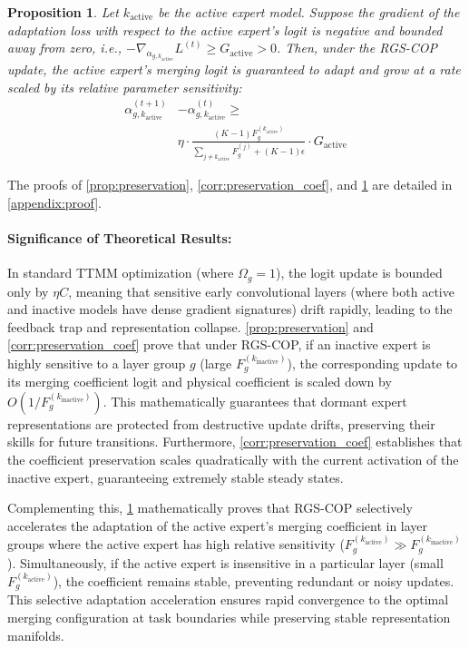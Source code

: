 \documentclass{article}
\theoremstyle{plain}
\newtheorem{proposition}[theorem]{Proposition}
\theoremstyle{definition}
\theoremstyle{remark}
\begin{document}
\begin{proposition}\label{prop:acceleration}
Let $k_{\text{active}}$ be the active expert model. Suppose the gradient of the adaptation loss with respect to the active expert's logit is negative and bounded away from zero, i.e., $-\nabla_{\alpha_{g, k_{\text{active}}}} L^{(t)} \geq G_{\text{active}} > 0$. Then, under the RGS-COP update, the active expert's merging logit is guaranteed to adapt and grow at a rate scaled by its relative parameter sensitivity:
\begin{equation}
\begin{aligned}
    \alpha^{(t+1)}_{g, k_{\text{active}}} &- \alpha^{(t)}_{g, k_{\text{active}}} \geq \\
    &\eta \cdot \frac{(K-1) F^{(k_{\text{active}})}_g}{\sum_{j \neq k_{\text{active}}} F^{(j)}_g + (K-1)\epsilon} \cdot G_{\text{active}}
\end{aligned}
\end{equation}
\end{proposition}

The proofs of \cref{prop:preservation}, \cref{corr:preservation_coef}, and \cref{prop:acceleration} are detailed in \cref{appendix:proof}. 

\paragraph{Significance of Theoretical Results:} 
In standard TTMM optimization (where $\Omega_g = 1$), the logit update is bounded only by $\eta C$, meaning that sensitive early convolutional layers (where both active and inactive models have dense gradient signatures) drift rapidly, leading to the feedback trap and representation collapse. \cref{prop:preservation} and \cref{corr:preservation_coef} prove that under RGS-COP, if an inactive expert is highly sensitive to a layer group $g$ (large $F^{(k_{\text{inactive}})}_g$), the corresponding update to its merging coefficient logit and physical coefficient is scaled down by $O(1 / F^{(k_{\text{inactive}})}_g)$. This mathematically guarantees that dormant expert representations are protected from destructive update drifts, preserving their skills for future transitions. Furthermore, \cref{corr:preservation_coef} establishes that the coefficient preservation scales quadratically with the current activation of the inactive expert, guaranteeing extremely stable steady states. 

Complementing this, \cref{prop:acceleration} mathematically proves that RGS-COP selectively accelerates the adaptation of the active expert's merging coefficient in layer groups where the active expert has high relative sensitivity ($F^{(k_{\text{active}})}_g \gg F^{(k_{\text{inactive}})}_g$). Simultaneously, if the active expert is insensitive in a particular layer (small $F^{(k_{\text{active}})}_g$), the coefficient remains stable, preventing redundant or noisy updates. This selective adaptation acceleration ensures rapid convergence to the optimal merging configuration at task boundaries while preserving stable representation manifolds.
\end{document}

